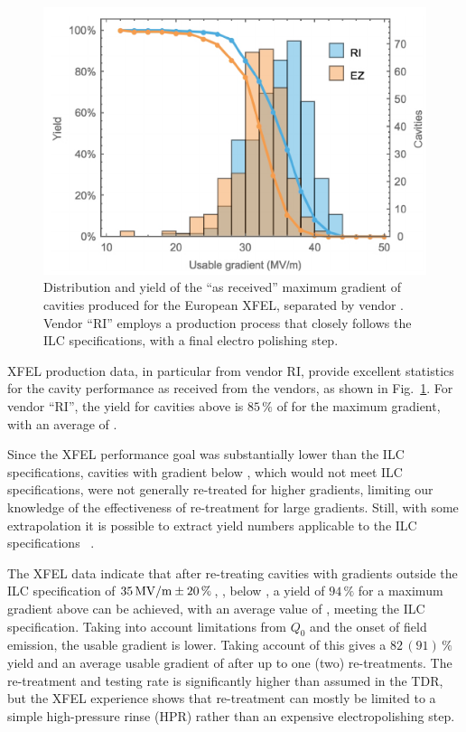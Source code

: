 \begin{figure}[htbp]
   \includegraphics[width=\hsize]{chapters/figures/prab-20-042004-fig33}
\caption{Distribution and yield of the ``as received'' maximum
gradient of cavities produced for the European XFEL, separated by vendor \cite[Fig. 33]{Reschke:2017gjp}. 
Vendor ``RI'' employs a production process that closely follows the ILC specifications, with a final electro polishing step.}
\label{fig:cavity-yield}
\end{figure}


XFEL production data, in particular from vendor RI, provide excellent statistics for the cavity performance as received from the vendors, as shown in Fig.~\ref{fig:cavity-yield}.
For vendor ``RI'', the yield for cavities above  is $85\,\%$ of for the maximum gradient, with an average of .

Since the XFEL performance goal was substantially lower than the ILC specifications, cavities with gradient below , which would not meet ILC specifications, were not generally re-treated for higher gradients, limiting our knowledge of the effectiveness of re-treatment for large gradients.
Still, with some extrapolation it is possible to extract yield numbers applicable to the ILC specifications ~\cite{bib:Walker:2017.lcws}.

The XFEL data indicate that after re-treating cavities with gradients outside the ILC specification of $35\,{\mathrm{MV/m}} \pm 20\,\%$, \ie, below , a yield of $94\,\%$ for a maximum gradient above  can be achieved, with an average value of , meeting the ILC specification.
Taking into account limitations from $Q_0$ and the onset of field emission, the usable gradient is lower.  Taking account of this gives a $82\,(91)\,\%$ yield and an average usable gradient of  after up to one (two) re-treatments.
The re-treatment and testing rate is significantly higher than assumed in the TDR, but the XFEL experience shows that re-treatment can mostly be limited to a simple high-pressure rinse (HPR) rather than an expensive electropolishing step.  

